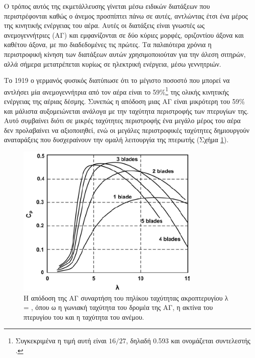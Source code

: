 \documentclass[12pt]{report}
\begin{document}
Ο τρόπος αυτός της εκμετάλλευσης γίνεται μέσω ειδικών διατάξεων που περιστρέφονται καθώς ο άνεμος προσπίπτει πάνω σε αυτές, αντλώντας έτσι ένα μέρος της κινητικής ενέργειας του αέρα. Αυτές οι διατάξεις είναι γνωστές ως
ανεμογεννήτριες (ΑΓ) και εμφανίζονται σε δύο κύριες μορφές, οριζοντίου άξονα και καθέτου άξονα, με πιο διαδεδομένες τις πρώτες. Τα παλαιότερα χρόνια η περιστροφική κίνηση των διατάξεων αυτών χρησιμοποιούταν για την άλεση σιτηρών, 
αλλά σήμερα μετατρέπεται κυρίως σε ηλεκτρική ενέργεια, μέσω γεννητριών.

Το 1919 ο γερμανός φυσικός {} διατύπωσε ότι το μέγιστο ποσοστό που μπορεί να αντλήσει μία ανεμογεννήτρια από τον αέρα είναι το 59\%\footnote{Συγκεκριμένα η τιμή αυτή είναι \(16/27\), δηλαδή 0.593 και 
ονομάζεται συντελεστής {}.} της ολικής κινητικής ενέργειας της αέριας δέσμης. Συνεπώς η απόδοση μιας ΑΓ είναι μικρότερη του 59\% και μάλιστα αυξομειώνεται ανάλογα με την ταχύτητα περιστροφής των πτερυγίων της. 
Αυτό συμβαίνει διότι σε μικρές ταχύτητες περιστροφής ένα μεγάλο μέρος του αέρα δεν προλαβαίνει να αξιοποιηθεί, ενώ οι μεγάλες περιστροφικές ταχύτητες δημιουργούν αναταράξεις που δυσχεραίνουν την ομαλή λειτουργία της πτερωτής
(Σχήμα \ref{fig:cp}).

\begin{figure}[t]
				\center
				\includegraphics[width=0.8\textwidth]{cp}
				\captionsetup{width=0.9\textwidth}
				\caption{Η απόδοση της ΑΓ συναρτήση του πηλίκου ταχύτητας ακροπτερυγίου λ = {}, όπου ω η γωνιακή ταχύτητα του δρομέα της ΑΓ, {} η ακτίνα του πτερυγίου του και 
								{} η ταχύτητα του ανέμου.}
				\label{fig:cp}
\end{figure}
\end{document}
